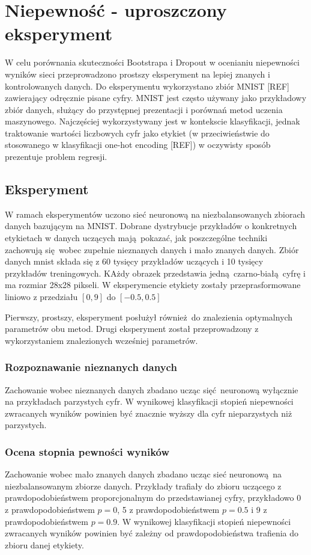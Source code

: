 \section{Niepewność - uproszczony eksperyment}
W celu porównania skuteczności Bootstrapa i Dropout w ocenianiu niepewności wyników sieci przeprowadzono prostszy eksperyment na lepiej znanych i kontrolowanych danych. Do eksperymentu wykorzystano zbiór MNIST [REF] zawierający odręcznie pisane cyfry. MNIST jest często używany jako przykładowy zbiór danych, służący do przystępnej prezentacji i porównań metod uczenia maszynowego. Najczęściej wykorzystywany jest w kontekscie klasyfikacji, jednak traktowanie wartości liczbowych cyfr jako etykiet (w przeciwieństwie do stosowanego w klasyfikacji one-hot encoding [REF]) w oczywisty sposób prezentuje problem regresji.    

\subsection{Eksperyment}
W ramach eksperymentów uczono sieć neuronową na niezbalansowanych zbiorach danych bazującym na MNIST. Dobrane dystrybucje przykładów o konkretnych etykietach w danych uczących mają pokazać, jak poszczególne techniki zachowują się wobec zupełnie nieznanych danych i mało znanych danych. Zbiór danych mnist składa się z 60 tysięcy przykładów uczących i 10 tysięcy przykładów treningowych. KAżdy obrazek przedstawia jedną czarno-białą cyfrę i ma rozmiar 28x28 pikseli. W eksperymencie etykiety zostały przeprasformowane liniowo z przedziału $[0,9]$ do $[-0.5,0.5]$ 

Pierwszy, prostszy, eksperyment posłużył również do znalezienia optymalnych parametrów obu metod. Drugi eksperyment został przeprowadzony z wykorzystaniem znalezionych wcześniej parametrów.

\subsubsection{Rozpoznawanie nieznanych danych}
Zachowanie wobec nieznanych danych zbadano ucząc sięć neuronową wyłącznie na przykładach parzystych cyfr. W wynikowej klasyfikacji stopień niepewności zwracanych wyników powinien być znacznie wyższy dla cyfr nieparzystych niż parzystych.


\subsubsection{Ocena stopnia pewności wyników}
Zachowanie wobec mało znanych danych zbadano ucząc sieć neuronową na niezbalansowanym zbiorze danych. Przykłady trafiały do zbioru uczącego z prawdopodobieństwem proporcjonalnym do przedstawianej cyfry, przykładowo 0 z prawdopodobieństwem $p=0$, 5 z prawdopodobieństwem $p=0.5$ i 9 z prawdopodobieństwem $p=0.9$. W wynikowej klasyfikacji stopień niepewności zwracanych wyników powinien być zależny od prawdopodobieństwa trafienia do zbioru danej etykiety.

